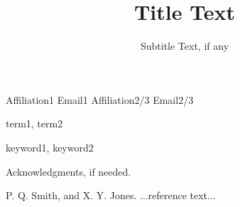 \documentclass[preprint]{sigplanconf}
\begin{document}
\copyrightdata{[to be supplied]}


\title{Title Text}
\subtitle{Subtitle Text, if any}

           {Affiliation1}
           {Email1}
           {Affiliation2/3}
           {Email2/3}

\maketitle





\terms
term1, term2

\keywords
keyword1, keyword2










\appendix


\acks

Acknowledgments, if needed.






\begin{thebibliography}{}
\softraggedright

P. Q. Smith, and X. Y. Jones. ...reference text...

\end{thebibliography}
\end{document}
